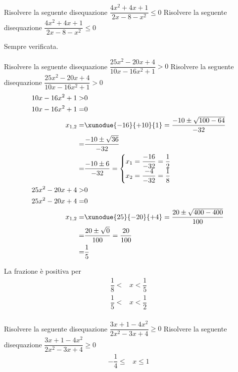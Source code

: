 \begin{exercise}
		Risolvere la seguente disequazione $\dfrac{4x^2+4x+1}{2x-8-x^2}\leq 0$
	\tcblower
	Risolvere la seguente disequazione $\dfrac{4x^2+4x+1}{2x-8-x^2}\leq 0$
	
	Sempre verificata.
\end{exercise}
\begin{exercise}
		Risolvere la seguente disequazione $\dfrac{25x^2-20x+4}{10x-16x^2+1}> 0$
		\tcblower
	Risolvere la seguente disequazione $\dfrac{25x^2-20x+4}{10x-16x^2+1}> 0$
\begin{align*}
10x-16x^2+1>&0\\
10x-16x^2+1=&0\\
x_{1,2}=&\xunodue{-16}{+10}{1}=\dfrac{-10\pm\sqrt{100-64}}{-32}\\
=&\dfrac{-10\pm\sqrt{36}}{-32}\\
=&\dfrac{-10\pm 6}{-32}=\begin{cases}
x_1=\dfrac{-16}{-32}=\dfrac{1}{2}\\
x_2=\dfrac{-4}{-32}=\dfrac{1}{8}
\end{cases}\\
25x^2-20x+4>&0\\
25x^2-20x+4=&0\\
x_{1,2}=&\xunodue{25}{-20}{+4}=\dfrac{20\pm\sqrt{400-400}}{100}\\
=&\dfrac{20\pm\sqrt{0}}{100}=\dfrac{20}{100}\\
=&\dfrac{1}{5}\\
\end{align*}
	\begin{center}
	
\end{center}
La frazione è positiva per
\begin{align*}
\dfrac{1}{8}<&x<\dfrac{1}{5}\\ \dfrac{1}{5}<&x<\dfrac{1}{2}\\
\end{align*}
\end{exercise}
\begin{exercise}
		Risolvere la seguente disequazione $\dfrac{3x+1-4x^2}{2x^2-3x+4}\geq 0$
	\tcblower
	Risolvere la seguente disequazione $\dfrac{3x+1-4x^2}{2x^2-3x+4}\geq 0$
	\begin{align*}
	-\dfrac{1}{4}\leq&x\leq 1
	\end{align*}
\end{exercise}
